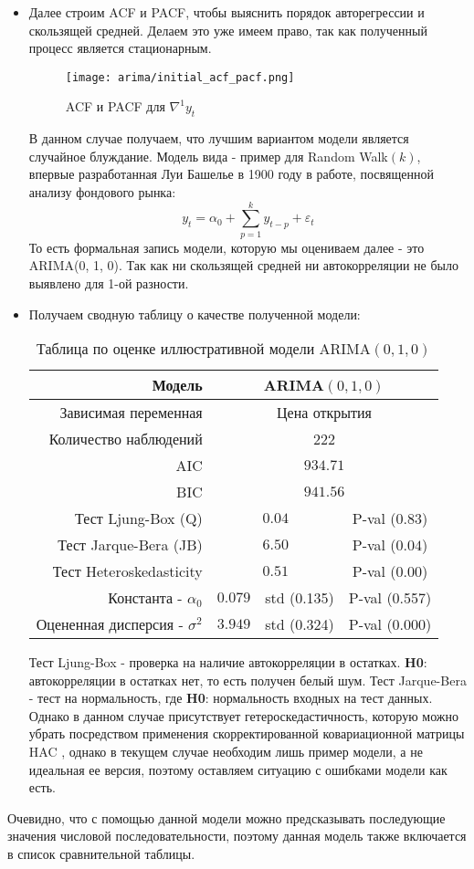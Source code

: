 \begin{itemize}
		\item Далее строим ACF и PACF, чтобы выяснить порядок авторегрессии и скользящей средней. Делаем это уже имеем право, так как полученный процесс является стационарным.
		\begin{figure}[H]
			\centering
			\texttt{[image: arima/initial\_acf\_pacf.png]}
			\caption{ACF и PACF для $\nabla^1y_t$}
		\end{figure}
		В данном случае получаем, что лучшим вариантом модели является случайное блуждание. Модель вида  - пример для Random Walk$(k)$, впервые разработанная Луи Башелье \cite{fama_market_efficiency} в 1900 году в работе, посвященной анализу фондового рынка:
		\begin{equation}
			y_t = \alpha_0 + \sum_{p = 1}^k y_{t - p} + \varepsilon_{t}
		\end{equation}
		То есть формальная запись модели, которую мы оцениваем далее - это ARIMA(0, 1, 0). Так как ни скользящей средней ни автокорреляции не было выявлено для 1-ой разности.
		
		\item Получаем сводную таблицу о качестве полученной модели:
		\begin{table}[H]
			\centering
			\begin{tabular}{r|ccc}
				\toprule
				Модель & \multicolumn{3}{c}{ARIMA$(0, 1, 0)$}\\
				\midrule[0.02cm]
				Зависимая переменная & \multicolumn{3}{c}{Цена открытия}\\
				Количество наблюдений & \multicolumn{3}{c}{222} \\
				AIC & \multicolumn{3}{c}{$934.71$} \\
				BIC & \multicolumn{3}{c}{$941.56$} \\
				\midrule[0.02cm]
				Тест Ljung-Box (Q) & \multicolumn{2}{c}{$0.04$} & P-val ($0.83$)\\
				Тест Jarque-Bera (JB) & \multicolumn{2}{c}{$6.50$} & P-val ($0.04$)\\
				Тест Heteroskedasticity & \multicolumn{2}{c}{$0.51$} & P-val ($0.00$)\\
				\midrule[0.02cm]
				Константа - $\alpha_0$ & $0.079$ & std (0.135) & P-val (0.557)\\
				Оцененная дисперсия - $\sigma^2$ & $3.949$ & std (0.324) & P-val (0.000)\\
				\midrule[0.02cm]
			\end{tabular}
			\caption{Таблица по оценке иллюстративной модели ARIMA$(0,1,0)$}
		\end{table}
		Тест Ljung-Box \cite{ljung_box_test} - проверка на наличие автокорреляции в остатках. \textbf{H0}: автокорреляции в остатках нет, то есть получен белый шум. Тест Jarque-Bera \cite{jarque_bera_test}- тест на нормальность, где \textbf{H0}: нормальность входных на тест данных. Однако в данном случае присутствует гетероскедастичность, которую можно убрать посредством применения скорректированной ковариационной матрицы HAC \cite{hac_standard_errors}, однако в текущем случае необходим лишь пример модели, а не идеальная ее версия, поэтому оставляем ситуацию с ошибками модели как есть. 
	\end{itemize}	

	Очевидно, что с помощью данной модели можно предсказывать последующие значения числовой последовательности, поэтому данная модель также включается в список сравнительной таблицы. 